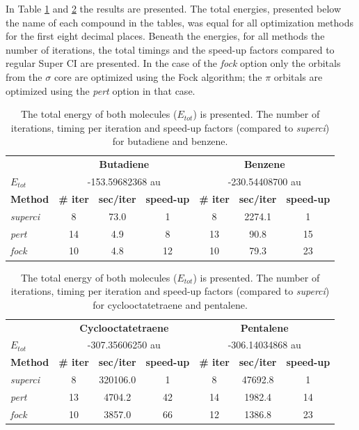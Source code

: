 In Table \ref{ch2.tab.flat1} and \ref{ch2.tab.flat2} the results are presented. The total energies, presented below the name of each compound in the tables, was equal for all optimization methods for the first eight decimal places. Beneath the energies, for all methods the number of iterations, the total timings and the speed-up factors compared to regular Super CI are presented. In the case of the \textit{fock} option only the orbitals from the $\sigma$ core are optimized using the Fock algorithm; the $\pi$ orbitals are optimized using the \textit{pert} option in that case.

\begin{table}[htbp]
\caption{The total energy of both molecules ($E_{tot}$) is presented. The number of iterations, timing per iteration and speed-up factors (compared to \textit{superci}) for butadiene and benzene.}
\begin{center}
\begin{tabular}{l c c c c c c}
\hline
&\multicolumn{3}{c}{\textbf{Butadiene}}&\multicolumn{3}{c}{\textbf{Benzene}}\\
$E_{tot}$&\multicolumn{3}{c}{-153.59682368 au}&\multicolumn{3}{c}{-230.54408700 au}\\
\textbf{Method}&\textbf{\# iter}&\textbf{sec/iter}&\textbf{speed-up}&\textbf{\# iter}&\textbf{sec/iter}&\textbf{speed-up}\\
\hline
\textit{superci}&8&73.0&1&8&2274.1&1\\
\textit{pert}&14&4.9&8&13&90.8&15\\
\textit{fock}&10&4.8&12&10&79.3&23\\
\end{tabular}
\label{ch2.tab.flat1}
\end{center}
\end{table}

\begin{table}[htbp]
\caption{The total energy of both molecules ($E_{tot}$) is presented. The number of iterations, timing per iteration and speed-up factors (compared to \textit{superci}) for cyclooctatetraene and pentalene.}
\begin{center}
\begin{tabular}{l c c c c c c}
\hline
&\multicolumn{3}{c}{\textbf{Cyclooctatetraene}}&\multicolumn{3}{c}{\textbf{Pentalene}}\\
$E_{tot}$&\multicolumn{3}{c}{-307.35606250 au}&\multicolumn{3}{c}{-306.14034868 au}\\
\textbf{Method}&\textbf{\# iter}&\textbf{sec/iter}&\textbf{speed-up}&\textbf{\# iter}&\textbf{sec/iter}&\textbf{speed-up}\\
\hline
\textit{superci}&8&320106.0&1&8&47692.8&1\\
\textit{pert}&13&4704.2&42&14&1982.4&14\\
\textit{fock}&10&3857.0&66&12&1386.8&23\\
\end{tabular}
\label{ch2.tab.flat2}
\end{center}
\end{table}

